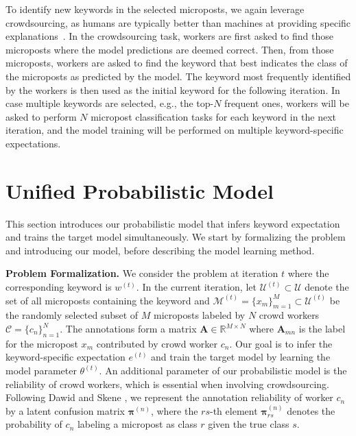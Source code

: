 \documentclass[letterpaper]{article}
\begin{document}
To identify new keywords in the selected microposts, we again leverage crowdsourcing, as humans are typically better than machines at providing specific explanations~\cite{mcdonnell2016relevant,chang2016crowd}. In the crowdsourcing task, workers are first asked to find those microposts where the model predictions are deemed correct. Then, from those microposts, workers are asked to find the keyword that best indicates the class of the microposts as predicted by the model. The keyword most frequently identified by the workers is then used as the initial keyword for the following iteration. In case multiple keywords are selected, e.g., the top-$N$ frequent ones, workers will be asked to perform $N$ micropost classification tasks for each keyword in the next iteration, and the model training will be performed on multiple keyword-specific expectations.

\section{Unified Probabilistic Model}
\label{UPmodel}

This section introduces our probabilistic model that infers keyword expectation and trains the target model simultaneously. We start by formalizing the problem and introducing our model, before describing the model learning method.

\smallskip
\noindent \textbf{Problem Formalization.} We consider the problem at iteration $t$ where the corresponding keyword is $w^{(t)}$. In the current iteration, let $\mathcal{U}^{(t)} \subset \mathcal{U}$ denote the set of all microposts containing the keyword and $\mathcal{M}^{(t)}= \{x_{m}\}_{m=1}^M\subset \mathcal{U}^{(t)}$ be the randomly selected subset of $M$ microposts labeled by $N$ crowd workers $\mathcal{C} = \{c_n\}_{n=1}^N$. The annotations form a matrix $\mathbf{A}\in \mathbb{R}^{M\times N}$ where $\mathbf{A}_{mn}$ is the label for the micropost $x_m$ contributed by crowd worker $c_n$. Our goal is to infer the keyword-specific expectation $e^{(t)}$ and train the target model by learning the model parameter $\theta^{(t)}$. An additional parameter of our probabilistic model is the reliability of crowd workers, which is essential when involving crowdsourcing. Following Dawid and Skene  \cite{dawid1979maximum,zheng2017truth}, we represent the annotation reliability of worker $c_n$ by a latent confusion matrix $\boldsymbol{\pi}^{(n)}$, where the $rs$-th element $\boldsymbol{\pi}_{rs}^{(n)}$ denotes the probability of $c_n$ labeling a micropost as class $r$ given the true class $s$.
\end{document}
